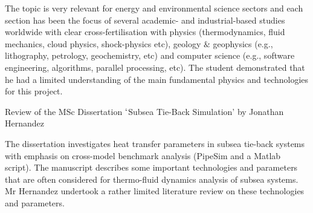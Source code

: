 \documentclass[14pt,twoside]{report}
\begin{document}
The topic is very relevant for energy and environmental science sectors and each section has been the focus of several academic- and industrial-based studies worldwide with clear cross-fertilisation with physics (thermodynamics, fluid mechanics, cloud physics, shock-physics etc), geology $\&$ geophysics (e.g., lithography, petrology, geochemistry, etc) and computer science (e.g., software engineering, algorithms, parallel processing, etc). The student demonstrated that he had a limited understanding of the main fundamental physics and technologies for this project.



\clearpage




\bigskip

\begin{center}
{\Large Review of the MSc Dissertation $\lq$Subsea Tie-Back Simulation' by Jonathan Hernandez}
\end{center}

\medskip

The dissertation investigates heat transfer parameters in subsea tie-back systems with emphasis on cross-model benchmark analysis (PipeSim and a Matlab script). The manuscript describes some important technologies and parameters that are often considered for thermo-fluid dynamics analysis of subsea systems. Mr Hernandez undertook a rather limited literature review on these technologies and parameters.
\end{document}
